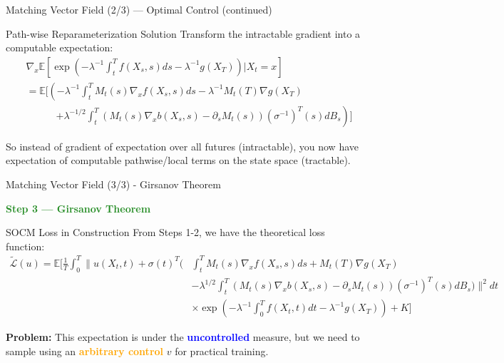 \documentclass[aspectratio=169,xcolor=dvipsnames]{beamer}
\begin{document}
\begin{frame}[allowframebreaks]{Matching Vector Field (2/3) — Optimal Control (continued)}
    \begin{alertblock}{Path-wise Reparameterization Solution}
        Transform the intractable gradient into a computable expectation:
        \begin{equation}
        \begin{aligned}
        &\nabla_x \mathbb{E}\left[\exp\left(-\lambda^{-1}\int_t^T f(X_s,s)ds - \lambda^{-1}g(X_T)\right) \bigg| X_t = x\right] \\[6pt]
        &= \mathbb{E}\Bigg[\left(-\lambda^{-1}\int_t^T M_t(s)\nabla_x f(X_s,s)ds - \lambda^{-1}M_t(T)\nabla g(X_T)\right. \\[4pt]
        &\qquad\quad \left.+ \lambda^{-1/2}\int_t^T (M_t(s)\nabla_x b(X_s,s) - \partial_s M_t(s))(\sigma^{-1})^T(s)dB_s\right) \Bigg]
        \end{aligned}
        \end{equation}

        \small
     So instead of gradient of expectation over all futures (intractable), you now have expectation of computable pathwise/local terms on the state space (tractable).
    \end{alertblock}


\end{frame}

\begin{frame}[allowframebreaks]{Matching Vector Field (3/3) - Girsanov Theorem}

    \begin{center}
        \Large\textcolor{ForestGreen}{\textbf{Step 3 — Girsanov Theorem}}
    \end{center}
    
    \vspace{0.3cm}
    
    \begin{block}{SOCM Loss in Construction}
        From Steps 1-2, we have the theoretical loss function:
        \begin{equation}
        \begin{aligned}
        \tilde{\mathcal{L}}(u) = \mathbb{E}\Bigg[\frac{1}{T}\int_0^T \Bigg\|u(X_t,t) + \sigma(t)^T \Bigg(
        &\int_t^T M_t(s)\nabla_x f(X_s,s)ds + M_t(T)\nabla g(X_T) \\[4pt]
        &- \lambda^{1/2}\int_t^T (M_t(s)\nabla_x b(X_s,s) - \partial_s M_t(s))(\sigma^{-1})^T(s)dB_s
        \Bigg)\Bigg\|^2 dt \\[4pt]
        &\times \exp\left(-\lambda^{-1}\int_0^T f(X_t,t)dt - \lambda^{-1}g(X_T)\right) + K\Bigg]
        \end{aligned}
        \end{equation}
        
        \textbf{Problem:} This expectation is under the \textcolor{blue}{\textbf{uncontrolled}} measure, but we need to sample using an \textcolor{orange}{\textbf{arbitrary control}} $v$ for practical training.
    \end{block}

\end{frame}
\end{document}
